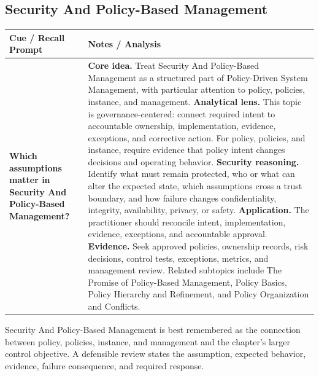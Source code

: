 \documentclass[11pt]{article}
\newcommand{\CornellHeader}{%
\rowcolor{Navy}\color{white}\bfseries Cue / Recall Prompt & \color{white}\bfseries Notes / Analysis\\\hline}
\newcommand{\CornellRow}[2]{%
\cellcolor{CueGray}\RaggedRight\textbf{#1} & \RaggedRight #2\\\hline}
\begin{document}
\subsection*{Security And Policy-Based Management}
\begin{longtable}{>{\RaggedRight\arraybackslash}p{}|>{\RaggedRight\arraybackslash}p{}}
\CornellHeader
\CornellRow{Which assumptions matter in Security And Policy-Based Management?}{\textbf{Core idea.} Treat Security And Policy-Based Management as a structured part of Policy-Driven System Management, with particular attention to policy, policies, instance, and management. \textbf{Analytical lens.} This topic is governance-centered: connect required intent to accountable ownership, implementation, evidence, exceptions, and corrective action. For policy, policies, and instance, require evidence that policy intent changes decisions and operating behavior. \textbf{Security reasoning.} Identify what must remain protected, who or what can alter the expected state, which assumptions cross a trust boundary, and how failure changes confidentiality, integrity, availability, privacy, or safety. \textbf{Application.} The practitioner should reconcile intent, implementation, evidence, exceptions, and accountable approval. \textbf{Evidence.} Seek approved policies, ownership records, risk decisions, control tests, exceptions, metrics, and management review. Related subtopics include The Promise of Policy-Based Management, Policy Basics, Policy Hierarchy and Refinement, and Policy Organization and Conflicts.}
\end{longtable}
\begin{topicsummary}
Security And Policy-Based Management is best remembered as the connection between policy, policies, instance, and management and the chapter's larger control objective. A defensible review states the assumption, expected behavior, evidence, failure consequence, and required response.
\end{topicsummary}
\end{document}
